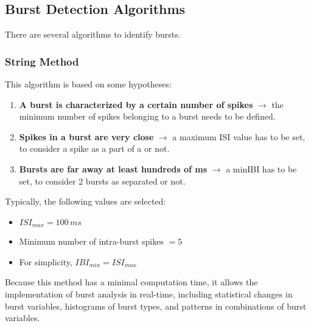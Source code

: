 \subsection{Burst Detection Algorithms}
There are several algorithms to identify bursts.
\subsubsection{String Method} 
This algorithm is based on some hypotheses:
\begin{enumerate}
    \item \textbf{A burst is characterized by a certain number of spikes} \(\rightarrow\) the minimum number of spikes belonging to a burst needs to be defined.
    \item \textbf{Spikes in a burst are very close} \(\rightarrow\) a maximum ISI value has to be set, to consider a spike as a part of a or not.
    \item \textbf{Bursts are far away at least hundreds of ms} \(\rightarrow\) a minIBI has to be set, to consider 2 bursts as separated or not.
\end{enumerate}
Typically, the following values are selected:
\begin{itemize}
    \item \(ISI_{max}=100\,ms\)
    \item Minimum number of intra-burst spikes \(=5\)
    \item For simplicity, \(IBI_{min}=ISI_{max}\)
\end{itemize}
Because this method has a minimal computation time, it allows the implementation of burst analysis in real-time, including statistical changes in burst variables, histograms of burst types, and patterns in combinations of burst variables.
